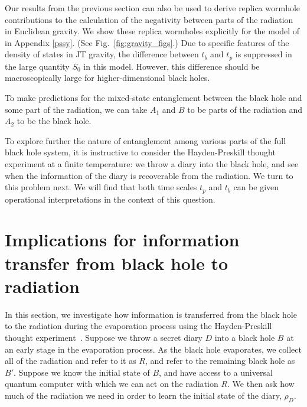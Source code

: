 \documentclass[a4paper,11pt]{article}
\begin{document}
\begin{enumerate}
Our results from the previous section can also be used to derive replica wormhole contributions to the calculation of the negativity between parts of the radiation in Euclidean gravity. We show these replica wormholes explicitly for the model of \cite{2019arXiv191111977P} in Appendix \ref{pssy}. (See Fig.~\ref{fig:gravity_figs}.) Due to specific features of the density of states in JT gravity, the difference between $t_b$ and $t_p$ is suppressed in the large quantity $S_0$ in this model. However, this difference should be macroscopically large for higher-dimensional black holes. 



To make predictions for the mixed-state entanglement between the black hole and some part of the radiation, we can take $A_1$ and $B$ to be parts of the radiation and $A_2$ to be the black hole. 

To explore further the nature of entanglement among various parts of the full black hole system, 
it is instructive to consider the Hayden-Preskill thought experiment at a finite temperature: we throw a diary into the black hole, and see when the information of the diary is recoverable from the radiation. We turn to this problem next. We will find that both time scales $t_p$ and $t_b$ can be given operational interpretations in the context of this question.


\section{Implications for information transfer from black hole to radiation} 
\label{transfer_sec}


In this section, we investigate how information is transferred from the black hole to the radiation during the evaporation process using 
the Hayden-Preskill thought experiment~\cite{2007JHEP...09..120H}. 
Suppose we throw a secret diary $D$ into a black hole $B$ at an early stage in the evaporation process. As the black hole evaporates, we collect all of the radiation and refer to it as $R$, and refer to the remaining black hole as $B'$. Suppose we know the initial state of $B$, and have access to a universal quantum computer with which we can act on the radiation $R$. We then ask how much of the radiation we need in order to learn the initial state of the diary, $\rho_D$. 


\end{enumerate}
\end{document}
